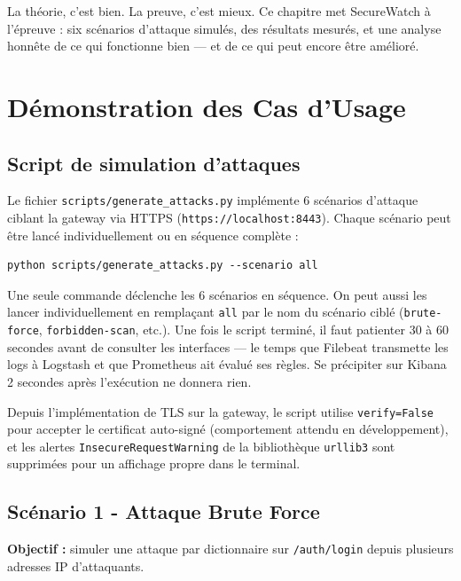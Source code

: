 \documentclass[12pt, a4paper]{report}
\begin{document}
La théorie, c'est bien. La preuve, c'est mieux. Ce chapitre met SecureWatch à l'épreuve : six scénarios d'attaque simulés, des résultats mesurés, et une analyse honnête de ce qui fonctionne bien — et de ce qui peut encore être amélioré.

\section{Démonstration des Cas d'Usage}

\subsection{Script de simulation d'attaques}

Le fichier \texttt{scripts/generate\_attacks.py} implémente 6 scénarios d'attaque ciblant la gateway via HTTPS (\texttt{https://localhost:8443}). Chaque scénario peut être lancé individuellement ou en séquence complète :

\begin{lstlisting}[style=bash, caption={Lancement de l'ensemble des scénarios d'attaque}]
python scripts/generate_attacks.py --scenario all
\end{lstlisting}

\medskip
Une seule commande déclenche les 6 scénarios en séquence. On peut aussi les lancer individuellement en remplaçant \texttt{all} par le nom du scénario ciblé (\texttt{brute-force}, \texttt{forbidden-scan}, etc.). Une fois le script terminé, il faut patienter 30 à 60 secondes avant de consulter les interfaces — le temps que Filebeat transmette les logs à Logstash et que Prometheus ait évalué ses règles. Se précipiter sur Kibana 2 secondes après l'exécution ne donnera rien.

\begin{infobox}
Depuis l'implémentation de TLS sur la gateway, le script utilise \texttt{verify=False} pour accepter le certificat auto-signé (comportement attendu en développement), et les alertes \texttt{InsecureRequestWarning} de la bibliothèque \texttt{urllib3} sont supprimées pour un affichage propre dans le terminal.
\end{infobox}

\subsection{Scénario 1 - Attaque Brute Force}

\textbf{Objectif :} simuler une attaque par dictionnaire sur \texttt{/auth/login} depuis plusieurs adresses IP d'attaquants.
\end{document}
